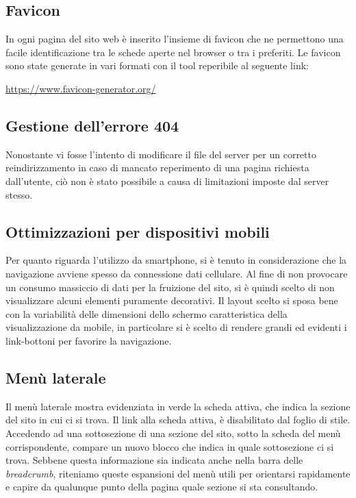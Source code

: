 \documentclass[12pt]{article}
\begin{document}
	\subsection{Favicon}
	In ogni pagina del sito web è inserito l'insieme di favicon che ne permettono una facile identificazione tra le schede aperte nel browser o tra i preferiti. Le favicon sono state generate in vari formati con il tool reperibile al seguente link:
	
	\begin{center}
		\url{https://www.favicon-generator.org/}
	\end{center}
	
	\subsection{Gestione dell'errore 404}
	Nonostante vi fosse l'intento di modificare il file  del server per un corretto reindirizzamento in caso di mancato reperimento di una pagina richiesta dall'utente, ciò non è stato possibile a causa di limitazioni imposte dal server stesso. 
		
	\subsection{Ottimizzazioni per dispositivi mobili}
	Per quanto riguarda l'utilizzo da smartphone, si è tenuto in considerazione che la navigazione avviene spesso da connessione dati cellulare. Al fine di non provocare un consumo massiccio di dati per la fruizione del sito, si è quindi scelto di non visualizzare alcuni elementi puramente decorativi. Il layout scelto si sposa bene con la variabilità delle dimensioni dello schermo caratteristica della visualizzazione da mobile, in particolare si è scelto di rendere grandi ed evidenti i link-bottoni per favorire la navigazione. 
	
	\subsection{Menù laterale} \label{ssec:menuusab}
	Il menù laterale mostra evidenziata in verde la scheda attiva, che indica la sezione del sito in cui ci si trova. Il link alla scheda attiva, è disabilitato dal foglio di stile. Accedendo ad una sottosezione di una sezione del sito, sotto la scheda del menù corrispondente, compare un nuovo blocco che indica in quale sottosezione ci si trova. Sebbene questa informazione sia indicata anche nella barra delle \textit{breadcrumb}, riteniamo queste espansioni del menù utili per orientarsi rapidamente e capire da qualunque punto della pagina quale sezione si sta consultando.
	
\end{document}
